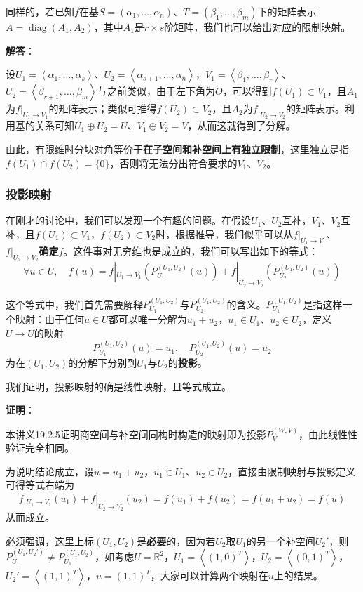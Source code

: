 \documentclass[a4paper,UTF8,fontset=windows,AutoFakeBold]{ctexart}
\DeclareMathOperator{\diag}{diag}
\newcommand*{\note}{\noindent *}
\newcommand{\proo}[1]{{\vspace{5pt}\kaishu\noindent\textbf{证明}：\vspace{-3pt}
\begin{compactitem}
    \item[] #1
\end{compactitem}
}}
\newcommand{\sol}[1]{{\vspace{5pt}\kaishu\noindent\textbf{解答}：\vspace{-3pt}
\begin{compactitem}
    \item[] #1
\end{compactitem}
}}
\begin{document}
同样的，若已知$f$在基$S=(\alpha_1,\dots,\alpha_n)$、$T=(\beta_1,\dots,\beta_m)$下的矩阵表示$A=\diag(A_1,A_2)$，其中$A_1$是$r\times s$阶矩阵，我们也可以给出对应的限制映射。

\sol{
    设$U_1=\left<\alpha_1,\dots,\alpha_s\right>$、$U_2=\left<\alpha_{s+1},\dots,\alpha_n\right>$，$V_1=\left<\beta_1,\dots,\beta_r\right>$、$U_2=\left<\beta_{r+1},\dots,\beta_m\right>$与之前类似，由于左下角为$O$，可以得到$f(U_1)\subset V_1$，且$A_1$为$f|_{U_1\to V_1}$的矩阵表示；类似可推得$f(U_2)\subset V_2$，且$A_2$为$f|_{U_2\to V_2}$的矩阵表示。利用基的关系可知$U_1\oplus U_2=U$、$V_1\oplus V_2=V$，从而这就得到了分解。
}

由此，有限维时分块对角等价于\textbf{在子空间和补空间上有独立限制}，这里独立是指$f(U_1)\cap f(U_2)=\{0\}$，否则将无法分出符合要求的$V_1$、$V_2$。

\subsubsection{投影映射}
在刚才的讨论中，我们可以发现一个有趣的问题。在假设$U_1$、$U_2$互补，$V_1$、$V_2$互补，且$f(U_1)\subset V_1$，$f(U_2)\subset V_2$时，根据推导，我们似乎可以从$f|_{U_1\to V_1}$、$f|_{U_2\to V_2}$\textbf{确定}$f$。这件事对无穷维也是成立的，我们可以写出如下的等式：
$$\forall u\in U,\quad f(u)=f|_{U_1\to V_1}(P_{U_1}^{(U_1,U_2)}(u))+f|_{U_2\to V_2}(P_{U_2}^{(U_1,U_2)}(u))$$

这个等式中，我们首先需要解释$P_{U_1}^{(U_1,U_2)}$与$P_{U_2}^{(U_1,U_2)}$的含义。$P_{U_1}^{(U_1,U_2)}$是指这样一个映射：由于任何$u\in U$都可以唯一分解为$u_1+u_2$，$u_1\in U_1$、$u_2\in U_2$，定义$U\to U$的映射
$$P_{U_1}^{(U_1,U_2)}(u)=u_1,\quad P_{U_2}^{(U_1,U_2)}(u)=u_2$$
为在$(U_1,U_2)$的分解下分别到$U_1$与$U_2$的\textbf{投影}。

我们证明，投影映射的确是线性映射，且等式成立。

\proo{
    本讲义19.2.5证明商空间与补空间同构时构造的映射即为投影$P_V^{(W,V)}$，由此线性性验证完全相同。

    为说明结论成立，设$u=u_1+u_2$，$u_1\in U_1$、$u_2\in U_2$，直接由限制映射与投影定义可得等式右端为
    $$f|_{U_1\to V_1}(u_1)+f|_{U_2\to V_2}(u_2)=f(u_1)+f(u_2)=f(u_1+u_2)=f(u)$$
    从而成立。    
}

\note 必须强调，这里上标$(U_1,U_2)$是\textbf{必要}的，因为若$U_2$取$U_1$的另一个补空间$U_2'$，则$P_{U_1}^{(U_1,U_2')}\ne P_{U_1}^{(U_1,U_2)}$，如考虑$U=\mathbb{R}^2$，$U_1=\left<(1,0)^T\right>$，$U_2=\left<(0,1)^T\right>$，$U_2'=\left<(1,1)^T\right>$，$u=(1,1)^T$，大家可以计算两个映射在$u$上的结果。
\end{document}
